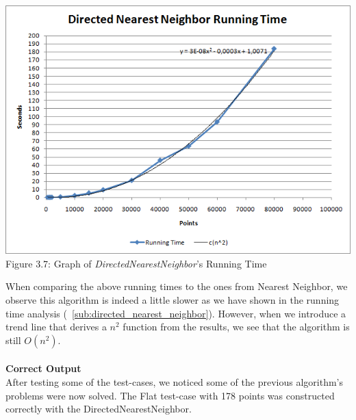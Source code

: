         \begin{center}
        \includegraphics[scale = 0.5]{2DirectedNearestNeighbor/dnnRuntimeGraph.png}\\
        Figure 3.7: Graph of \textit{DirectedNearestNeighbor}'s Running Time
        \label{fig:dnn_runnningtime}
        \end{center}

        \noindent When comparing the above running times to the ones from Nearest Neighbor, we observe this algorithm is indeed a little slower as we have shown in the running time analysis (~\ref{sub:directed_nearest_neighbor}). However, when we introduce a trend line that derives a $n^2$ function from the results, we see that the algorithm is still $O(n^2)$.\\\\
        \textbf{Correct Output}\\
        After testing some of the test-cases, we noticed some of the previous algorithm's problems were now solved. The Flat test-case with 178 points was constructed correctly with the DirectedNearestNeighbor.

